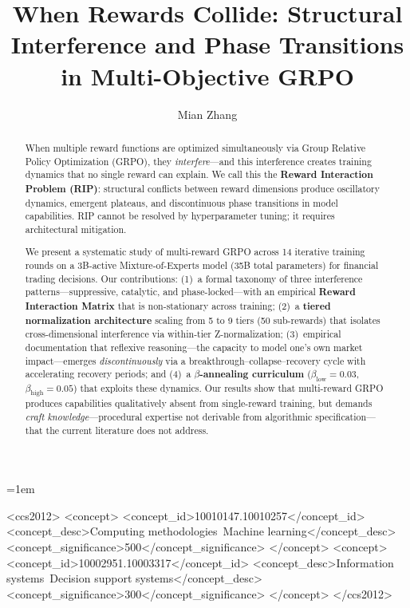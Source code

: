 \documentclass[sigconf]{acmart}
\begin{document}
\emergencystretch=1em

\title{When Rewards Collide: Structural Interference and Phase Transitions in Multi-Objective GRPO}

\author{Mian Zhang}

\begin{abstract}
When multiple reward functions are optimized simultaneously via Group Relative Policy Optimization (GRPO), they \textit{interfere}---and this interference creates training dynamics that no single reward can explain. We call this the \textbf{Reward Interaction Problem (RIP)}: structural conflicts between reward dimensions produce oscillatory dynamics, emergent plateaus, and discontinuous phase transitions in model capabilities. RIP cannot be resolved by hyperparameter tuning; it requires architectural mitigation.

We present a systematic study of multi-reward GRPO across 14 iterative training rounds on a 3B-active Mixture-of-Experts model (35B total parameters) for financial trading decisions. Our contributions: (1)~a formal taxonomy of three interference patterns---suppressive, catalytic, and phase-locked---with an empirical \textbf{Reward Interaction Matrix} that is non-stationary across training; (2)~a \textbf{tiered normalization architecture} scaling from 5 to 9 tiers (50 sub-rewards) that isolates cross-dimensional interference via within-tier Z-normalization; (3)~empirical documentation that reflexive reasoning---the capacity to model one's own market impact---emerges \textit{discontinuously} via a breakthrough--collapse--recovery cycle with accelerating recovery periods; and (4)~a \textbf{$\beta$-annealing curriculum} ($\beta_{\text{low}}=0.03$, $\beta_{\text{high}}=0.05$) that exploits these dynamics. Our results show that multi-reward GRPO produces capabilities qualitatively absent from single-reward training, but demands \textit{craft knowledge}---procedural expertise not derivable from algorithmic specification---that the current literature does not address.
\end{abstract}

\begin{CCSXML}
<ccs2012>
<concept>
<concept_id>10010147.10010257</concept_id>
<concept_desc>Computing methodologies~Machine learning</concept_desc>
<concept_significance>500</concept_significance>
</concept>
<concept>
<concept_id>10002951.10003317</concept_id>
<concept_desc>Information systems~Decision support systems</concept_desc>
<concept_significance>300</concept_significance>
</concept>
</ccs2012>
\end{CCSXML}
\end{document}
